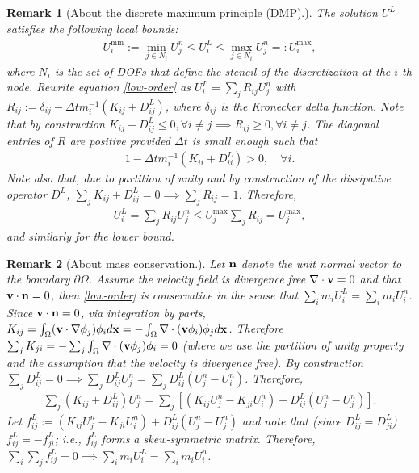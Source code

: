 \documentclass{article}
\newtheorem{remark}{Remark}
\numberwithin{remark}{subsection}
\newcommand{\bfv}{{\bf v}}
\newcommand{\bfn}{{\bf n}}
\newcommand{\bfx}{{\bf x}}
\begin{document}
\begin{remark}[About the discrete maximum principle (DMP).]
  The solution $U^L$ satisfies the following local bounds:
  \begin{align}\label{local-bounds}
    U_i^{\min}:= \min_{j\in N_i} U_j^n \leq U_i^L \leq \max_{j\in N_i} U_j^n=:U_i^{\max},
  \end{align}
  where $N_i$ is the set of DOFs that define the stencil of the discretization at the $i$-th node.
  Rewrite equation \eqref{low-order} as $U_i^L=\sum_j R_{ij}U_j^n$ with
  $R_{ij}:=\delta_{ij}-\Delta t m_i^{-1} (K_{ij}+D_{ij}^L)$, where $\delta_{ij}$ is
  the Kronecker delta function. Note that by construction
  $K_{ij}+D^L_{ij}\leq 0, \forall i\neq j\implies R_{ij}\geq 0, \forall i\neq j$.
  The diagonal entries of $R$ are positive provided $\Delta t$ is small
  enough such that
  \begin{align}\label{CFL_low_order_scheme}
    1-\Delta t m_i^{-1}(K_{ii}+D_{ii}^L)>0,\quad \forall i.
  \end{align}
  Note also that, due to partition of unity and by construction of the dissipative operator $D^L$,
  $\sum_j K_{ij}+D^L_{ij}=0\implies \sum_j R_{ij}=1$. Therefore,
  \begin{align*}
    U_i^L=\sum_j R_{ij}U_j^n\leq U_j^{\max}\sum_j R_{ij} = U_j^{\max},
  \end{align*}
  and similarly for the lower bound.
\end{remark}

\begin{remark}[About mass conservation.]\label{remark:conservation_low-order}
  Let $\bfn$ denote the unit normal vector to the boundary $\partial\Omega$.
  Assume the velocity field is divergence free $\nabla\cdot \bfv=0$ and that $\bfv\cdot \bfn=0$,
  then \eqref{low-order} is conservative in the sense that
  $\sum_i m_i U_i^L=\sum_i m_i U_i^n$. Since $\bfv\cdot \bfn=0$, via integration by parts,
  $K_{ij}=\int_\Omega (\bfv\cdot\nabla \phi_j)\phi_i d\bfx = -\int_\Omega\nabla\cdot(\bfv\phi_i)\phi_jd\bfx$. Therefore $\sum_j K_{ji}=-\sum_j\int_\Omega \nabla\cdot(\bfv\phi_j)\phi_i=0$
  (where we use the partition of unity property and
  the assumption that the velocity is divergence free).
  By construction $\sum_jD_{ij}^L=0\implies \sum_j D_{ij}^L U_j^n=\sum_jD_{ij}^L (U_j^n-U_i^n)$.
  Therefore,
  \begin{align*}
    \sum_j (K_{ij}+D_{ij}^L)U_j^n =
    \sum_j \left[(K_{ij}U_j^n - K_{ji}U_i^n) + D_{ij}^L(U_j^n-U_j^n)\right].
  \end{align*}
  Let $f_{ij}^L:=(K_{ij}U_j^n - K_{ji}U_i^n) + D_{ij}^L(U_j^n-U_j^n)$
  and note that (since $D^L_{ij}=D_{ji}^L$)
  $f_{ij}^L=-f_{ji}^L$; i.e., $f_{ij}^L$ forms a skew-symmetric matrix.
  Therefore, $\sum_i\sum_j f_{ij}^L=0\implies\sum_i m_i U_i^L=\sum_i m_i U_i^n$.
\end{remark}
\end{document}
